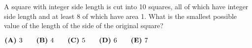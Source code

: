 

A square with integer side length is cut into 10 squares, all of which have integer side length and at least 8 of which have area 1. What is the smallest possible value of the length of the side of the original square?

$\textbf{(A)}\hspace{.05in}3 \qquad \textbf{(B)}\hspace{.05in}4 \qquad \textbf{(C)}\hspace{.05in}5 \qquad \textbf{(D)}\hspace{.05in}6 \qquad \textbf{(E)}\hspace{.05in}7 $
